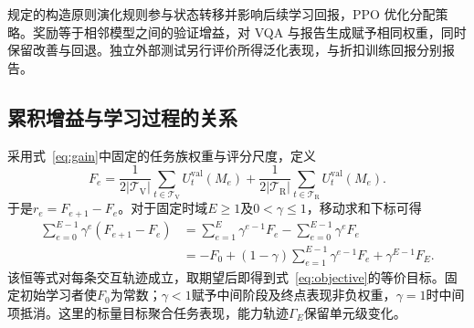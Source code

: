 规定的构造原则演化规则参与状态转移并影响后续学习回报，PPO 优化分配策略。奖励等于相邻模型之间的验证增益，对 VQA 与报告生成赋予相同权重，同时保留改善与回退。独立外部测试另行评价所得泛化表现，与折扣训练回报分别报告。

\subsection{累积增益与学习过程的关系}
\label{app:cumulative_gains}

采用式~\ref{eq:gain}中固定的任务族权重与评分尺度，定义
\[
F_e=\frac{1}{2|\mathcal T_{\mathrm V}|}\sum_{t\in\mathcal T_{\mathrm V}}U_t^{\mathrm{val}}(M_e)
+\frac{1}{2|\mathcal T_{\mathrm R}|}\sum_{t\in\mathcal T_{\mathrm R}}U_t^{\mathrm{val}}(M_e).
\]
于是$r_e=F_{e+1}-F_e$。对于固定时域$E\geq1$及$0<\gamma\leq1$，移动求和下标可得
\begin{equation}
\begin{aligned}
\sum_{e=0}^{E-1}\gamma^e(F_{e+1}-F_e)
&=\sum_{e=1}^{E}\gamma^{e-1}F_e-\sum_{e=0}^{E-1}\gamma^eF_e\\
&=-F_0+(1-\gamma)\sum_{e=1}^{E-1}\gamma^{e-1}F_e+\gamma^{E-1}F_E.
\end{aligned}
\label{eq:trajectory_objective}
\end{equation}
该恒等式对每条交互轨迹成立，取期望后即得到式~\ref{eq:objective}的等价目标。固定初始学习者使$F_0$为常数；$\gamma<1$赋予中间阶段及终点表现非负权重，$\gamma=1$时中间项抵消。这里的标量目标聚合任务表现，能力轨迹$\Gamma_E$保留单元级变化。


